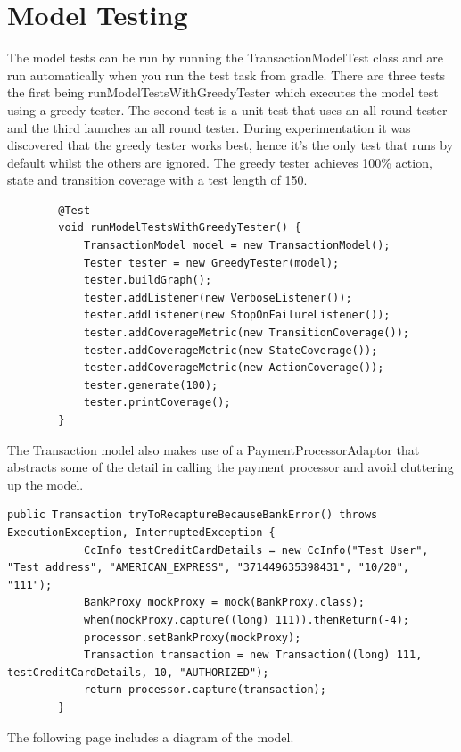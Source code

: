 \documentclass[11pt, a4paper]{article}
\begin{document}
\section{Model Testing}
    The model tests can be run by running the TransactionModelTest class and are run automatically when you run the test task from gradle. There are three tests the first being runModelTestsWithGreedyTester which executes the model test using a greedy tester. The second test is a unit test that uses an all round tester and the third launches an all round tester. During experimentation it was discovered that the greedy tester works best, hence it's the only test that runs by default whilst the others are ignored.
    The greedy tester achieves 100\% action, state and transition coverage with a test length of 150.
    \begin{lstlisting}
        @Test
        void runModelTestsWithGreedyTester() {
            TransactionModel model = new TransactionModel();
            Tester tester = new GreedyTester(model);
            tester.buildGraph();
            tester.addListener(new VerboseListener());
            tester.addListener(new StopOnFailureListener());
            tester.addCoverageMetric(new TransitionCoverage());
            tester.addCoverageMetric(new StateCoverage());
            tester.addCoverageMetric(new ActionCoverage());
            tester.generate(100);
            tester.printCoverage();
        }
    \end{lstlisting}
    The Transaction model also makes use of a PaymentProcessorAdaptor that abstracts some of the detail in calling the payment processor and avoid cluttering up the model.
    \begin{lstlisting}[caption=A snippet showing how some of the abstraction is done]
        public Transaction tryToRecaptureBecauseBankError() throws ExecutionException, InterruptedException {
            CcInfo testCreditCardDetails = new CcInfo("Test User", "Test address", "AMERICAN_EXPRESS", "371449635398431", "10/20", "111");
            BankProxy mockProxy = mock(BankProxy.class);
            when(mockProxy.capture((long) 111)).thenReturn(-4);
            processor.setBankProxy(mockProxy);
            Transaction transaction = new Transaction((long) 111, testCreditCardDetails, 10, "AUTHORIZED");
            return processor.capture(transaction);
        }
    \end{lstlisting}
    The following page includes a diagram of the model.
    
\end{document}
